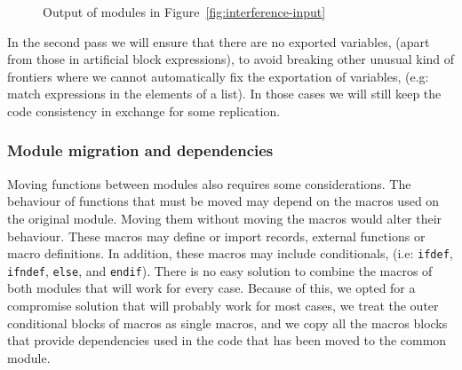 \begin{figure}
\begin{minipage}[t]{1\columnwidth}%
%
\end{minipage}

\begin{minipage}[t]{1\columnwidth}%
%
\end{minipage}

\begin{minipage}[t]{1\columnwidth}%
%
\end{minipage}

\caption{Output of modules in Figure~\ref{fig:interference-input}\label{fig:interference-output}}
\end{figure}


In the second pass we will ensure that there are no exported variables,
(apart from those in artificial block expressions), to avoid breaking
other unusual kind of frontiers where we cannot automatically fix
the exportation of variables, (e.g: match expressions in the elements
of a list). In those cases we will still keep the code consistency
in exchange for some replication.


\subsubsection{Module migration and dependencies}

Moving functions between modules also requires some considerations.
The behaviour of functions that must be moved may depend on the macros
used on the original module. Moving them without moving the macros
would alter their behaviour. These macros may define or import records,
external functions or macro definitions. In addition, these macros
may include conditionals, (i.e: \texttt{ifdef}, \texttt{ifndef}, \texttt{else},
and \texttt{endif}). There is no easy solution to combine the macros
of both modules that will work for every case. Because of this, we
opted for a compromise solution that will probably work for most cases,
we treat the outer conditional blocks of macros as single macros,
and we copy all the macros blocks that provide dependencies used in
the code that has been moved to the common module.

